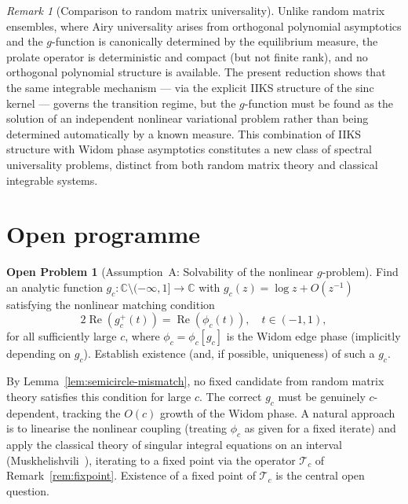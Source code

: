 \documentclass[12pt,a4paper]{amsart}
\theoremstyle{definition}
\newtheorem{problem}[theorem]{Open Problem}
\theoremstyle{remark}
\newtheorem{remark}[theorem]{Remark}
\begin{document}
\begin{remark}[Comparison to random matrix universality]
\label{rem:rmt-comparison}
Unlike random matrix ensembles, where Airy universality arises
from orthogonal polynomial asymptotics and the $g$-function is
canonically determined by the equilibrium measure, the prolate
operator is deterministic and compact (but not finite rank),
and no orthogonal polynomial structure is available.
The present reduction shows that the same integrable mechanism
--- via the explicit IIKS structure of the sinc kernel --- governs
the transition regime, but the $g$-function must be found as the
solution of an independent nonlinear variational problem rather than
being determined automatically by a known measure.
This combination of IIKS structure with Widom phase asymptotics
constitutes a new class of spectral universality problems, distinct
from both random matrix theory and classical integrable systems.
\end{remark}

\section{Open programme}
\label{sec:open}

\begin{problem}[Assumption~A: Solvability of the nonlinear $g$-problem]
\label{prob:g-existence}
Find an analytic function $g_c:\mathbb{C}\setminus(-\infty,1]\to\mathbb{C}$
with $g_c(z)=\log z + O(z^{-1})$ satisfying the nonlinear matching
condition
\[
  2\operatorname{Re}(g_c^+(t)) = \operatorname{Re}(\phi_c(t)),
  \quad t\in(-1,1),
\]
for all sufficiently large $c$, where $\phi_c = \phi_c[g_c]$
is the Widom edge phase (implicitly depending on $g_c$).
Establish existence (and, if possible, uniqueness) of such a $g_c$.

By Lemma~\ref{lem:semicircle-mismatch}, no fixed candidate from
random matrix theory satisfies this condition for large $c$.
The correct $g_c$ must be genuinely $c$-dependent, tracking the
$O(c)$ growth of the Widom phase.
A natural approach is to linearise the nonlinear coupling
(treating $\phi_c$ as given for a fixed iterate) and apply the
classical theory of singular integral equations on an interval
(Muskhelishvili~\cite{Muskhelishvili1953}), iterating to a fixed
point via the operator $\mathcal{T}_c$ of
Remark~\ref{rem:fixpoint}.
Existence of a fixed point of $\mathcal{T}_c$ is the central
open question.
\end{problem}
\end{document}
